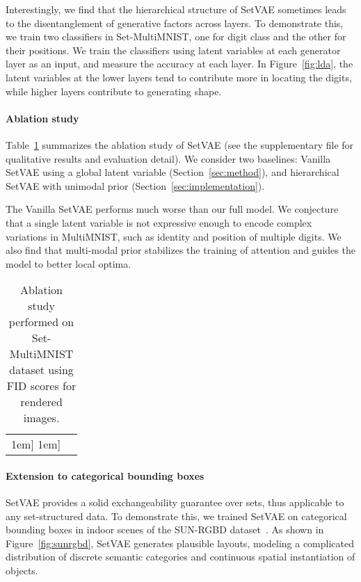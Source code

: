 \documentclass[final]{arxiv/cvpr}
\newcommand{\cutparagraphup}{\vspace*{-0.1in}}
\begin{document}
Interestingly, we find that the hierarchical structure of SetVAE sometimes leads to the disentanglement of generative factors across layers.
To demonstrate this, we train two classifiers in Set-MultiMNIST, one for digit class and the other for their positions.
We train the classifiers using latent variables at each generator layer as an input, and measure the accuracy at each layer.
In Figure~\ref{fig:lda}, the latent variables at the lower layers tend to contribute more in locating the digits, while higher layers contribute to generating shape.

\cutparagraphup
\paragraph{Ablation study}
Table~\ref{table:ablation} summarizes the ablation study of SetVAE (see the supplementary file for qualitative results and evaluation detail).
We consider two baselines: Vanilla SetVAE using a global latent variable  (Section~\ref{sec:method}), and hierarchical SetVAE with unimodal prior (Section~\ref{sec:implementation}).

The Vanilla SetVAE performs much worse than our full model.
We conjecture that a single latent variable is not expressive enough to encode complex variations in MultiMNIST, such as identity and position of multiple digits.
We also find that multi-modal prior stabilizes the training of attention and guides the model to better local optima.

\begin{table}[t!]
\begin{center}
\caption{Ablation study performed on Set-MultiMNIST dataset using FID scores for {} rendered images.}
\vspace{-0.2cm}
\footnotesize
\label{table:ablation}
\begin{tabular}{lc}
\Xhline{2\arrayrulewidth}
\-1em]\Xhline{2\arrayrulewidth}
\-1em]\Xhline{2\arrayrulewidth}
\end{tabular}
\end{center}
\vspace{-0.4cm}
\end{table}

\cutparagraphup
\paragraph{Extension to categorical bounding boxes}
SetVAE provides a solid exchangeability guarantee over sets, thus applicable to any set-structured data.
To demonstrate this, we trained SetVAE on categorical bounding boxes in indoor scenes of the SUN-RGBD dataset~\cite{song2015sun}.
As shown in Figure~\ref{fig:sunrgbd}, SetVAE generates plausible layouts, modeling a complicated distribution of discrete semantic categories and continuous spatial instantiation of objects.
\end{document}
